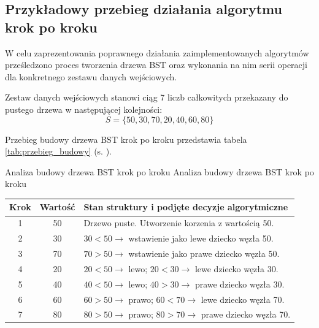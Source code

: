 \subsection{Przykładowy przebieg działania algorytmu krok po kroku}

\hspace{0.60cm}
W celu zaprezentowania poprawnego działania zaimplementowanych algorytmów prześledzono proces tworzenia drzewa BST oraz wykonania na nim serii operacji dla konkretnego zestawu danych wejściowych.

\hspace{0.60cm}
Zestaw danych wejściowych stanowi ciąg 7 liczb całkowitych przekazany do pustego drzewa w następującej kolejności:
\begin{equation}
    S = \{50, 30, 70, 20, 40, 60, 80\}
\end{equation}

\hspace{0.60cm}
Przebieg budowy drzewa BST krok po kroku przedstawia tabela \ref{tab:przebieg_budowy} (s. \pageref{tab:przebieg_budowy}).

\begin{tabela}
	{Analiza budowy drzewa BST krok po kroku}
	{Analiza budowy drzewa BST krok po kroku}
	{
		\begin{tabular}{|c|c|p{7cm}|} \hline
			\textbf{Krok} & \textbf{Wartość} & \textbf{Stan struktury i podjęte decyzje algorytmiczne} \\ \hline
			1 & 50 & Drzewo puste. Utworzenie korzenia z wartością 50. \\ \hline
			2 & 30 & $30 < 50 \rightarrow$ wstawienie jako lewe dziecko węzła 50. \\ \hline
			3 & 70 & $70 > 50 \rightarrow$ wstawienie jako prawe dziecko węzła 50. \\ \hline
			4 & 20 & $20 < 50 \rightarrow$ lewo; $20 < 30 \rightarrow$ lewe dziecko węzła 30. \\ \hline
			5 & 40 & $40 < 50 \rightarrow$ lewo; $40 > 30 \rightarrow$ prawe dziecko węzła 30. \\ \hline
			6 & 60 & $60 > 50 \rightarrow$ prawo; $60 < 70 \rightarrow$ lewe dziecko węzła 70. \\ \hline
			7 & 80 & $80 > 50 \rightarrow$ prawo; $80 > 70 \rightarrow$ prawe dziecko węzła 70. \\ \hline
		\end{tabular}
	}
	\label{tab:przebieg_budowy}
\end{tabela}

